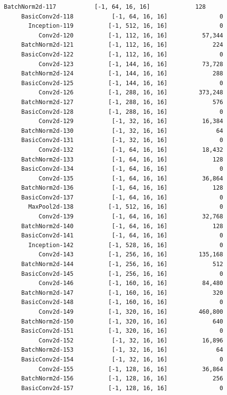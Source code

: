 \documentclass[a4paper, 12pt]{article}
\begin{document}
\begin{lstlisting}[language=sh]
     BatchNorm2d-117           [-1, 64, 16, 16]             128
     BasicConv2d-118           [-1, 64, 16, 16]               0
       Inception-119          [-1, 512, 16, 16]               0
          Conv2d-120          [-1, 112, 16, 16]          57,344
     BatchNorm2d-121          [-1, 112, 16, 16]             224
     BasicConv2d-122          [-1, 112, 16, 16]               0
          Conv2d-123          [-1, 144, 16, 16]          73,728
     BatchNorm2d-124          [-1, 144, 16, 16]             288
     BasicConv2d-125          [-1, 144, 16, 16]               0
          Conv2d-126          [-1, 288, 16, 16]         373,248
     BatchNorm2d-127          [-1, 288, 16, 16]             576
     BasicConv2d-128          [-1, 288, 16, 16]               0
          Conv2d-129           [-1, 32, 16, 16]          16,384
     BatchNorm2d-130           [-1, 32, 16, 16]              64
     BasicConv2d-131           [-1, 32, 16, 16]               0
          Conv2d-132           [-1, 64, 16, 16]          18,432
     BatchNorm2d-133           [-1, 64, 16, 16]             128
     BasicConv2d-134           [-1, 64, 16, 16]               0
          Conv2d-135           [-1, 64, 16, 16]          36,864
     BatchNorm2d-136           [-1, 64, 16, 16]             128
     BasicConv2d-137           [-1, 64, 16, 16]               0
       MaxPool2d-138          [-1, 512, 16, 16]               0
          Conv2d-139           [-1, 64, 16, 16]          32,768
     BatchNorm2d-140           [-1, 64, 16, 16]             128
     BasicConv2d-141           [-1, 64, 16, 16]               0
       Inception-142          [-1, 528, 16, 16]               0
          Conv2d-143          [-1, 256, 16, 16]         135,168
     BatchNorm2d-144          [-1, 256, 16, 16]             512
     BasicConv2d-145          [-1, 256, 16, 16]               0
          Conv2d-146          [-1, 160, 16, 16]          84,480
     BatchNorm2d-147          [-1, 160, 16, 16]             320
     BasicConv2d-148          [-1, 160, 16, 16]               0
          Conv2d-149          [-1, 320, 16, 16]         460,800
     BatchNorm2d-150          [-1, 320, 16, 16]             640
     BasicConv2d-151          [-1, 320, 16, 16]               0
          Conv2d-152           [-1, 32, 16, 16]          16,896
     BatchNorm2d-153           [-1, 32, 16, 16]              64
     BasicConv2d-154           [-1, 32, 16, 16]               0
          Conv2d-155          [-1, 128, 16, 16]          36,864
     BatchNorm2d-156          [-1, 128, 16, 16]             256
     BasicConv2d-157          [-1, 128, 16, 16]               0

\end{lstlisting}
\end{document}
